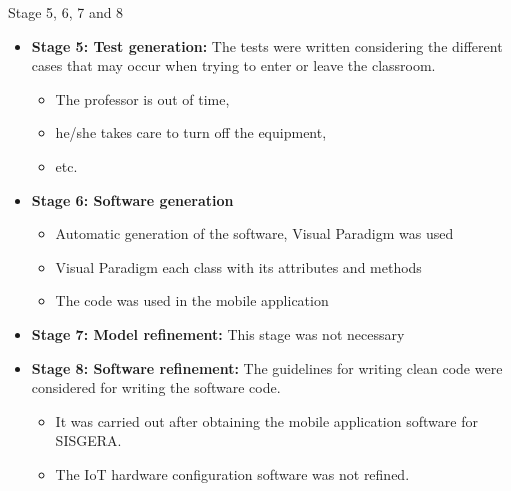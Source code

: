 \documentclass[notes=show, 10pt, xcolor=table]{beamer}
\begin{document}
    \begin{frame}{Stage 5, 6, 7 and 8}
        \begin{itemize}
        	\item \textbf{Stage 5: Test generation:} The tests were written considering the different cases that may occur when trying to enter or leave the classroom.
        	\begin{itemize}
        		\item The professor is out of time,
        		\item he/she takes care to turn off the equipment,
        		\item etc.
            \end{itemize}
        	\item \textbf{Stage 6: Software generation}
    		\begin{itemize}
    			\item Automatic generation of the software, Visual Paradigm was used
    			\item Visual Paradigm each class with its attributes and methods
    			\item The code was used in the mobile application
    		\end{itemize}
    		\item \textbf{Stage 7: Model refinement:} This stage was not necessary
    		\item \textbf{Stage 8: Software refinement:} The guidelines for writing clean code were considered for writing the software code.
    		\begin{itemize}
    			\item It was carried out after obtaining the mobile application software for SISGERA.
    			\item The IoT hardware configuration software was not refined.
    		\end{itemize}
    	\end{itemize}
        

\end{frame}
\end{document}

